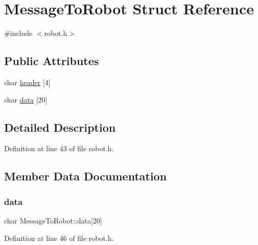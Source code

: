 \hypertarget{struct_message_to_robot}{}\section{Message\+To\+Robot Struct Reference}
\label{struct_message_to_robot}


{\ttfamily \#include $<$robot.\+h$>$}

\subsection*{Public Attributes}
\begin{DoxyCompactItemize}
\item 
char \hyperlink{struct_message_to_robot_ab00202c6cfdd86ea4cd891c972405db6}{header} \mbox{[}4\mbox{]}
\item 
char \hyperlink{struct_message_to_robot_abf7dafbba72784855abd50469ba82705}{data} \mbox{[}20\mbox{]}
\end{DoxyCompactItemize}


\subsection{Detailed Description}


Definition at line 43 of file robot.\+h.



\subsection{Member Data Documentation}
\mbox{\label{struct_message_to_robot_abf7dafbba72784855abd50469ba82705}} 
\subsubsection{\texorpdfstring{data}{data}}
{\footnotesize\ttfamily char Message\+To\+Robot\+::data\mbox{[}20\mbox{]}}



Definition at line 46 of file robot.\+h.

\mbox{\label{struct_message_to_robot_ab00202c6cfdd86ea4cd891c972405db6}} 
